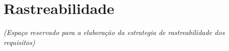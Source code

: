 \section{Rastreabilidade}
	\textit{(Espaço reservado para a elaboração da estrategia de rastreabilidade dos requisitos)}